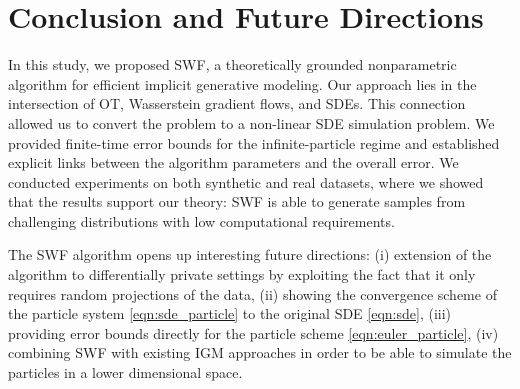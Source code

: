 
\section{Conclusion and Future Directions}

In this study, we proposed SWF, a theoretically grounded nonparametric algorithm for efficient implicit generative modeling. 
Our approach lies in the intersection of OT, Wasserstein gradient flows, and SDEs. This connection allowed us to convert the problem to a non-linear SDE simulation problem. We provided finite-time error bounds for the infinite-particle regime and established explicit links between the algorithm parameters and the overall error. We conducted experiments on both synthetic and real datasets, where we showed that the results support our theory: SWF is able to generate samples from challenging distributions with low computational requirements. 

The SWF algorithm opens up interesting future directions: (i) extension of the algorithm to differentially private settings \cite{dwork2014algorithmic} by exploiting the fact that it only requires random projections of the data, (ii) showing the convergence scheme of the particle system \eqref{eqn:sde_particle} to the original SDE \eqref{eqn:sde}, (iii) providing error bounds directly for the particle scheme \eqref{eqn:euler_particle}, (iv) combining SWF with existing IGM approaches in order to be able to simulate the particles in a lower dimensional space.  
 